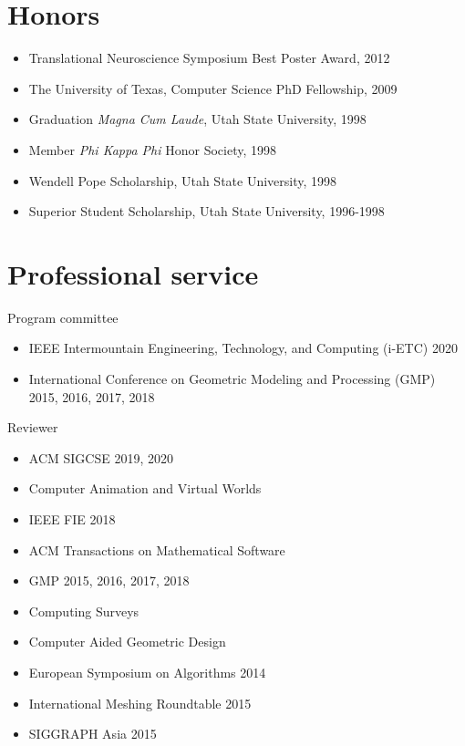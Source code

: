 \documentclass[margin,line]{res}
\begin{document}
\begin{resume}
\section{\sc Honors}
\begin{itemize}[label={},leftmargin=0pt]
  \setlength\itemsep{0em}
  \item Translational Neuroscience Symposium Best Poster Award, 2012 %
  \item The University of Texas, Computer Science PhD Fellowship, 2009 %
  \item Graduation \emph{Magna Cum Laude}, Utah State University, 1998
  \item Member \emph{Phi Kappa Phi} Honor Society, 1998
  \item Wendell Pope Scholarship, Utah State University, 1998
  \item Superior Student Scholarship, Utah State University, 1996-1998
\end{itemize}

\begin{LONG}
\end{LONG}

\section{\sc Professional service}
Program committee
\vspace{2mm}
\begin{itemize}[label={},leftmargin=5mm]
  \item IEEE Intermountain Engineering, Technology, and Computing (i-ETC) 2020
  \item International Conference on Geometric Modeling and Processing (GMP) 2015, 2016, 2017, 2018
\end{itemize}

Reviewer
\vspace{2mm}
\begin{itemize}[label={},leftmargin=5mm]
  \item ACM SIGCSE 2019, 2020
  \item Computer Animation and Virtual Worlds
  \item IEEE FIE 2018
  \item ACM Transactions on Mathematical Software
  \item GMP 2015, 2016, 2017, 2018
  \item Computing Surveys
  \item Computer Aided Geometric Design
  \item European Symposium on Algorithms 2014
  \item International Meshing Roundtable 2015
  \item SIGGRAPH Asia 2015
\end{itemize}


\end{resume}
\end{document}
